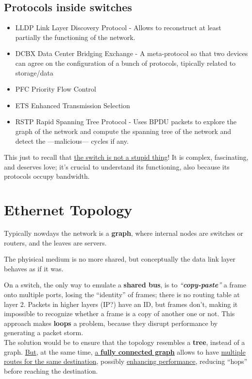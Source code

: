 \subsection{Protocols inside switches}
\begin{itemize}
   \item LLDP Link Layer Discovery Protocol - Allows to reconstruct at least partially the functioning of the network.
   \item DCBX Data Center Bridging Exchange - A meta-protocol so that two devices can agree on the configuration of a bunch of protocols, tipically related to storage/data 
   \item PFC Priority Flow Control
   \item ETS Enhanced Transmission Selection
   \item RSTP Rapid Spanning Tree Protocol - Uses BPDU packets to explore the graph of the network and compute the spanning tree of the network and detect the ---malicious--- cycles if any.
\end{itemize}

This just to recall that \ul{the switch is not a stupid thing}! It is complex, fascinating, and deserves love; it's crucial to understand its functioning, also because its protocols occupy bandwidth.

\section{Ethernet Topology}
Typically nowdays the network is a \textbf{graph}, where internal nodes are switches or routers, and the leaves are servers.

The phyisical medium is no more shared, but conceptually the data link layer behaves as if it was.

On a switch, the only way to emulate a \textbf{shared bus}, is to \textit{``\textbf{copy-paste}''} a frame onto multiple ports, losing the ``identity'' of frames; there is no routing table at layer 2. Packets in higher layers (IP?) have an ID, but frames don't, making it impossible to recognize whether a frame is a copy of another one or not.
This approach makes \textbf{loops} a problem, because they disrupt performance by generating a packet storm.\\
The solution would be to ensure that the topology resembles a \textbf{tree}, instead of a graph.
\ul{But}, at the same time, \ul{a \textbf{fully connected graph}} allows to have \ul{multiple routes for the same destination}, possibly \ul{enhancing performance}, reducing ``hops'' before reaching the destination.

